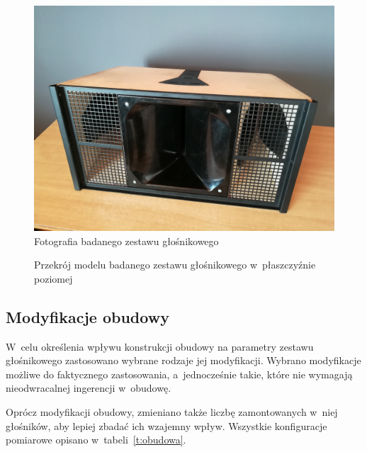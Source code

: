 \documentclass[12pt]{oska}
\begin{document}
		
		\begin{figure}[H]
		\centering
		\includegraphics[width=.8\textwidth]{zdjecie.jpg}
		\caption{Fotografia badanego zestawu głośnikowego}
		\label{r:zdjecie}
		\end{figure}
		
		\begin{figure}[H]
			\centering
			\caption{Przekrój modelu badanego zestawu głośnikowego w~płaszczyźnie poziomej}
			\label{r:przekroj}
		\end{figure}
	
	\subsection{Modyfikacje obudowy}
	
		W~celu określenia wpływu konstrukcji obudowy na parametry zestawu głośnikowego zastosowano wybrane rodzaje jej modyfikacji. Wybrano modyfikacje możliwe do faktycznego zastosowania, a~jednocześnie takie, które nie wymagają nieodwracalnej ingerencji w~obudowę.
		
		Oprócz modyfikacji obudowy, zmieniano także liczbę zamontowanych w~niej głośników, aby lepiej zbadać ich wzajemny wpływ. Wszystkie konfiguracje pomiarowe opisano w~tabeli~\ref{t:obudowa}.
		
\end{document}
